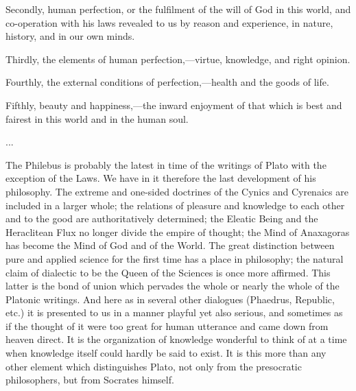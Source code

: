\documentclass[11pt,letter]{article}
\begin{document}
\par  Secondly, human perfection, or the fulfilment of the will of God in this world, and co-operation with his laws revealed to us by reason and experience, in nature, history, and in our own minds.

\par  Thirdly, the elements of human perfection,—virtue, knowledge, and right opinion.

\par  Fourthly, the external conditions of perfection,—health and the goods of life.

\par  Fifthly, beauty and happiness,—the inward enjoyment of that which is best and fairest in this world and in the human soul.

\par  ...

\par  The Philebus is probably the latest in time of the writings of Plato with the exception of the Laws. We have in it therefore the last development of his philosophy. The extreme and one-sided doctrines of the Cynics and Cyrenaics are included in a larger whole; the relations of pleasure and knowledge to each other and to the good are authoritatively determined; the Eleatic Being and the Heraclitean Flux no longer divide the empire of thought; the Mind of Anaxagoras has become the Mind of God and of the World. The great distinction between pure and applied science for the first time has a place in philosophy; the natural claim of dialectic to be the Queen of the Sciences is once more affirmed. This latter is the bond of union which pervades the whole or nearly the whole of the Platonic writings. And here as in several other dialogues (Phaedrus, Republic, etc.) it is presented to us in a manner playful yet also serious, and sometimes as if the thought of it were too great for human utterance and came down from heaven direct. It is the organization of knowledge wonderful to think of at a time when knowledge itself could hardly be said to exist. It is this more than any other element which distinguishes Plato, not only from the presocratic philosophers, but from Socrates himself.
\end{document}
